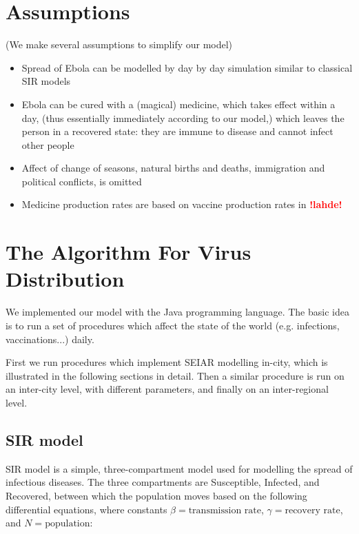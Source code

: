 \documentclass[12pt]{article}
\newcommand{\NB}[0]{\textcolor{red}{\textbf{!lahde!}}}
\begin{document}
\newpage
\section{Assumptions}

(We make several assumptions to simplify our model)
\begin{itemize}

\item Spread of Ebola can be modelled by day by day simulation similar to classical SIR models
\item Ebola can be cured with a (magical) medicine, which takes effect within a day, (thus essentially immediately according to our model,) which leaves the person in a recovered state: they are immune to disease and cannot infect other people
\item Affect of change of seasons, natural births and deaths, immigration and political conflicts, is omitted
\item Medicine production rates are based on vaccine production rates in \NB


\end{itemize}

\newpage
\section{The Algorithm For Virus Distribution}

We implemented our model with the Java programming language. The basic idea is to run a set of procedures which affect the state of the world (e.g. infections, vaccinations...) daily.

First we run procedures which implement SEIAR modelling in-city, which is illustrated in the following sections in detail. Then a similar procedure is run on an inter-city level, with different parameters, and finally on an inter-regional level.

\subsection{SIR model}

SIR model is a simple, three-compartment model used for modelling the spread of infectious diseases. The three compartments are Susceptible, Infected, and Recovered, between which the population moves based on the following differential equations, where constants $\beta = \text{transmission rate}$, $\gamma = \text{recovery rate}$, and $N = \text{population}$:
\end{document}
